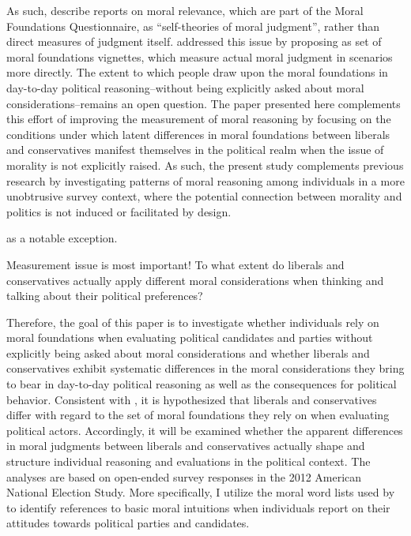 \documentclass[12pt]{article}
\begin{document}
As such, \citet[1031]{graham2009liberals} describe reports on moral relevance, which are part of the Moral Foundations Questionnaire, as ``self-theories of moral judgment'', rather than direct measures of judgment itself. \citet{clifford2015moral} addressed this issue by proposing as set of moral foundations vignettes, which measure actual moral judgment in scenarios more directly. The extent to which people draw upon the moral foundations in day-to-day political reasoning--without being explicitly asked about moral considerations--remains an open question. The paper presented here complements this effort of improving the measurement of moral reasoning by focusing on the conditions under which latent differences in moral foundations between liberals and conservatives manifest themselves in the political realm when the issue of morality is not explicitly raised. As such, the present study complements previous research by investigating patterns of moral reasoning among individuals in a more unobtrusive survey context, where the potential connection between morality and politics is not induced or facilitated by design.

\citet{clifford2013words} as a notable exception.

Measurement issue is most important! To what extent do liberals and conservatives actually apply different moral considerations when thinking and talking about their political preferences?

Therefore, the goal of this paper is to investigate whether individuals rely on moral foundations when evaluating political candidates and parties without explicitly being asked about moral considerations and whether liberals and conservatives exhibit systematic differences in the moral considerations they bring to bear in day-to-day political reasoning as well as the consequences for political behavior. Consistent with \citet{graham2009liberals}, it is hypothesized that liberals and conservatives differ with regard to the set of moral foundations they rely on when evaluating political actors. Accordingly, it will be examined whether the apparent differences in moral judgments between liberals and conservatives actually shape and structure individual reasoning and evaluations in the political context. The analyses are based on open-ended survey responses in the 2012 American National Election Study. More specifically, I utilize the moral word lists used by \citet{graham2009liberals} to identify references to basic moral intuitions when individuals report on their attitudes towards political parties and candidates.
\end{document}

